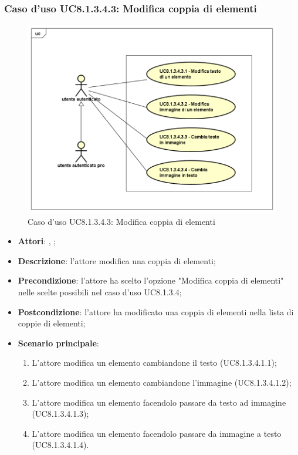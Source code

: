 	\subsubsection{Caso d'uso UC8.1.3.4.3: Modifica coppia di elementi}
	\label{UC8.1.3.4.3}
	\begin{figure}[h]
		\centering
		\includegraphics[scale=0.5,keepaspectratio]{UML/UC8_1_3_4_3.png}
		\caption{Caso d'uso UC8.1.3.4.3: Modifica coppia di elementi}
	\end{figure}
	\FloatBarrier
	\begin{itemize}
		\item \textbf{Attori}: \uau, \uaupro;
		\item \textbf{Descrizione}: l'attore modifica una coppia di elementi;
		\item \textbf{Precondizione}: l'attore ha scelto l'opzione "Modifica coppia di elementi" nelle scelte possibili nel caso d'uso UC8.1.3.4;
		\item \textbf{Postcondizione}: l'attore ha modificato una coppia di elementi nella lista di coppie di elementi; 
		\item \textbf{Scenario principale}: 
		\begin{enumerate}
			\item L'attore modifica un elemento cambiandone il testo (UC8.1.3.4.1.1);
			\item L'attore modifica un elemento cambiandone l'immagine (UC8.1.3.4.1.2);
			\item L'attore modifica un elemento facendolo passare da testo ad immagine (UC8.1.3.4.1.3);
			\item L'attore modifica un elemento facendolo passare da immagine a testo (UC8.1.3.4.1.4).	
		\end{enumerate}
	\end{itemize}
	
